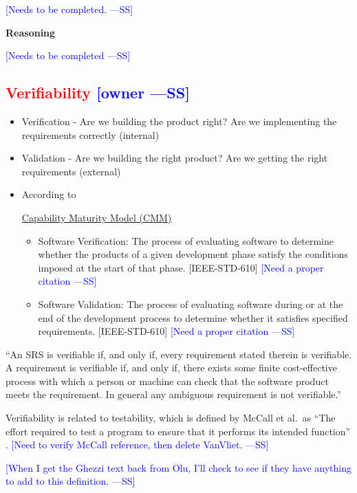 \documentclass[letterpaper,cleveref]{lipics-v2019}
\newcommand{\authornote}[3]{\textcolor{#1}{[#3 ---#2]}}
\newcommand{\authornote}[3]{}
\newcommand{\wss}[1]{\authornote{blue}{SS}{#1}} %
\newcommand{\notdone}[1]{\textcolor{red}{#1}}
\theoremstyle{definition}
\begin{document}
\wss{Needs to be completed.}

\noindent \textbf{Reasoning}

\wss{Needs to be completed}

\subsection{\notdone{Verifiability} \wss{owner}}

\begin{itemize}
	
\item Verification - Are we building the product right?  Are we implementing the
  requirements correctly (internal)
\item Validation - Are we building the right product? Are we getting the right
  requirements (external)
\item According to
	
  \href{https://en.wikipedia.org/wiki/Software_verification_and_validation}{Capability
    Maturity Model (CMM)}
  \begin{itemize}
  \item Software Verification: The process of evaluating software to determine
    whether the products of a given development phase satisfy the conditions
    imposed at the start of that phase. [IEEE-STD-610] \wss{Need a proper
      citation}
  \item Software Validation: The process of evaluating software during or at the
    end of the development process to determine whether it satisfies specified
    requirements. [IEEE-STD-610] \wss{Need a proper citation}
  \end{itemize}
\end{itemize}

``An SRS is verifiable if, and only if, every requirement stated therein is
verifiable. A requirement is verifiable if, and only if, there exists some
finite cost-effective process with which a person or machine can check that the
software product meets the requirement. In general any ambiguous requirement is
not verifiable.'' \citep{IEEE1998}

Verifiability is related to testability, which is defined by McCall et al.\ as
``The effort required to test a program to ensure that it performs its intended
function'' \citep{VanVliet2000}. \wss{Need to verify McCall reference, then
  delete VanVliet.}

\wss{When I get the Ghezzi text back from Olu, I'll check to see if they have
  anything to add to this definition.}
\end{document}
